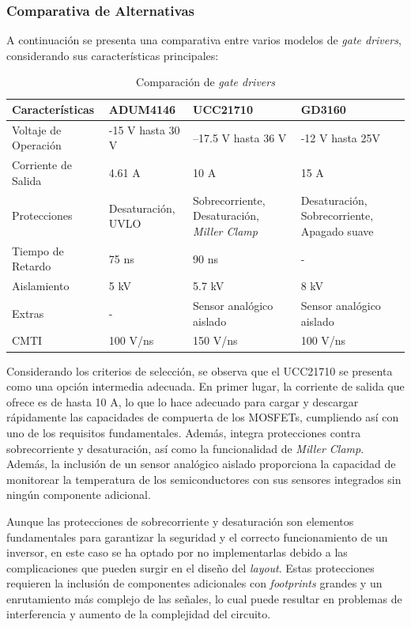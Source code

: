 \subsubsection{Comparativa de Alternativas}

A continuación se presenta una comparativa entre varios modelos de \textit{gate drivers}, considerando sus características principales:

\begin{table}[H]
	\centering
	\begin{tabular}{|l|p{3.5cm}|p{3.5cm}|p{3.5cm}|}
		\hline
		\textbf{Características} & \textbf{ADUM4146} & \textbf{UCC21710} & \textbf{GD3160} \\
		\hline
		Voltaje de Operación & -15 V hasta 30 V & –17.5 V hasta 36 V & -12 V hasta 25V \\
		\hline
		Corriente de Salida & 4.61 A & 10 A & 15 A \\
		\hline
		Protecciones & Desaturación, UVLO & Sobrecorriente, Desaturación, \textit{Miller Clamp} & Desaturación, Sobrecorriente, Apagado suave \\
		\hline
		Tiempo de Retardo & 75 ns & 90 ns & - \\
		\hline
		Aislamiento & 5 kV & 5.7 kV & 8 kV \\
		\hline
		Extras & - & Sensor analógico aislado & Sensor analógico aislado \\
		\hline
		CMTI & 100 V/ns & 150 V/ns & 100 V/ns \\
		\hline
	\end{tabular}
	\caption{Comparación de \textit{gate drivers}}
\end{table}

Considerando los criterios de selección, se observa que el UCC21710 se presenta como una opción intermedia adecuada. En primer lugar, la corriente de salida que ofrece es de hasta 10 A, lo que lo hace adecuado para cargar y descargar rápidamente las capacidades de compuerta de los MOSFETs, cumpliendo así con uno de los requisitos fundamentales. Además, integra protecciones contra sobrecorriente y desaturación, así como la funcionalidad de \textit{Miller Clamp}. Además, la inclusión de un sensor analógico aislado proporciona la capacidad de monitorear la temperatura de los semiconductores con sus sensores integrados sin ningún componente adicional.

Aunque las protecciones de sobrecorriente y desaturación son elementos fundamentales para garantizar la seguridad y el correcto funcionamiento de un inversor, en este caso se ha optado por no implementarlas debido a las complicaciones que pueden surgir en el diseño del \textit{layout}. Estas protecciones requieren la inclusión de componentes adicionales con \textit{footprints} grandes y un enrutamiento más complejo de las señales, lo cual puede resultar en problemas de interferencia y aumento de la complejidad del circuito.

